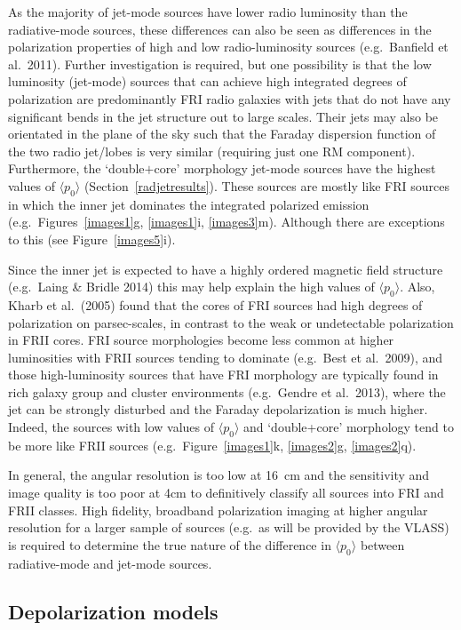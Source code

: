 \documentclass{mnras}
\begin{document}
As the majority of jet-mode sources have lower radio luminosity than the radiative-mode sources, these differences can also be seen as differences in the polarization properties of high and low radio-luminosity sources (e.g.~Banfield et al.~2011). 
Further investigation is required, but one possibility is that the low luminosity (jet-mode) sources that can achieve high integrated degrees of polarization are predominantly FRI radio galaxies with jets that do not have any significant bends in the jet structure out to large scales. Their jets may also be orientated in the plane of the sky such that the Faraday dispersion function of the two radio jet/lobes is very similar (requiring just one RM component). Furthermore, the `double$+$core' morphology jet-mode sources have the highest values of $\langle p_0 \rangle$ (Section~\ref{radjetresults}). These sources are mostly like FRI sources in which the inner jet dominates the integrated polarized emission (e.g.~Figures~\ref{images1}g, \ref{images1}i, \ref{images3}m). Although there are exceptions to this (see Figure~\ref{images5}i). 

Since the inner jet is expected to have a highly ordered magnetic field structure (e.g.~Laing \& Bridle 2014) this may help explain the high values of $\langle p_0 \rangle$. Also, Kharb et al.~(2005) found that the cores of FRI sources had high degrees of polarization on parsec-scales, in contrast to the weak or undetectable polarization in FRII cores. 
FRI source morphologies become less common at higher luminosities with FRII sources tending to dominate (e.g.~Best et al.~2009), and those high-luminosity sources that have FRI morphology are typically found in rich galaxy group and cluster environments (e.g.~Gendre et al.~2013), where the jet can be strongly disturbed and the Faraday depolarization is much higher. Indeed, the sources with low values of $\langle p_0 \rangle$ and `double+core' morphology tend to be more like FRII sources (e.g.~Figure~\ref{images1}k, \ref{images2}g, \ref{images2}q). 

In general, the angular resolution is too low at 16~cm and the sensitivity and image quality is too poor at 4cm to definitively classify all sources into FRI and FRII classes. 
High fidelity, broadband polarization imaging at higher angular resolution for a larger sample of sources (e.g.~as will be provided by the VLASS) is required to determine the true nature of the difference in $\langle p_0 \rangle$ between radiative-mode and jet-mode sources. 

\subsection{Depolarization models}
\end{document}
